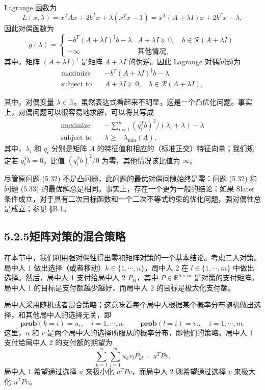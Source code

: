 \documentclass[UTF8,12pt,a4paper,fontset=fandol]{ctexart}
\begin{document}
Lagrange 函数为
\[
L(x,\lambda)=x^TAx+2b^Tx+\lambda(x^Tx-1)=x^T(A+\lambda I)x+2b^Tx-\lambda,
\]
因此对偶函数为
\[
g(\lambda)=
\begin{cases}
-b^T(A+\lambda I)^\dagger b-\lambda & A+\lambda I\succeq 0,\quad b\in\mathcal{R}(A+\lambda I)\\
-\infty & \text{其他情况},
\end{cases}
\]
其中，矩阵 $(A+\lambda I)^\dagger$ 是矩阵 $A+\lambda I$ 的伪逆。因此 Lagrange 对偶问题为
\begin{equation}
\begin{aligned}
\text{maximize}\quad & -b^T(A+\lambda I)^\dagger b-\lambda\\
\text{subject to}\quad & A+\lambda I\succeq 0,\quad b\in\mathcal{R}(A+\lambda I),
\end{aligned}
\tag{5.33}
\end{equation}

其中，对偶变量 $\lambda\in\mathbb{R}$。虽然表达式看起来不明显，这是一个凸优化问题。事实上，对偶问题可以很容易地求解，可以将其写成
\[
\begin{aligned}
\text{maximize}\quad & -\sum_{i=1}^n (q_i^Tb)^2/(\lambda_i+\lambda)-\lambda\\
\text{subject to}\quad & \lambda\geq -\lambda_{\min}(A),
\end{aligned}
\]
其中，$\lambda_i$ 和 $q_i$ 分别是矩阵 $A$ 的特征值和相应的（标准正交）特征向量；我们规定若 $q_i^Tb=0$，比值 $(q_i^Tb)^2/0$ 为零，其他情况该比值为 $\infty$。

尽管原问题 (5.32) 不是凸问题，此问题的最优对偶间隙始终是零：问题 (5.32) 和问题 (5.33) 的最优解总是相同。事实上，存在一个更为一般的结论：如果 Slater 条件成立，对于具有二次目标函数和一个二次不等式约束的优化问题，强对偶性总是成立；参见 §B.1。

\subsection*{5.2.5\quad 矩阵对策的混合策略}

在本节中，我们利用强对偶性得出零和矩阵对策的一个基本结论。考虑二人对策。局中人 1 做出选择（或者移动）$k\in\{1,\cdots,n\}$，局中人 2 在 $l\in\{1,\cdots,m\}$ 中做出选择。然后，局中人 1 支付给局中人 2 $P_{kl}$，其中 $P\in\mathbb{R}^{n\times m}$ 是对策的支付矩阵。局中人 1 的目标是支付额越少越好，而局中人 2 的目标是极大化支付额。

局中人采用随机或者混合策略；这意味着每个局中人根据某个概率分布随机做出选择，和其他局中人的选择无关，即
\[
\mathbf{prob}(k=i)=u_i,\quad i=1,\cdots,n,\qquad
\mathbf{prob}(l=i)=v_i,\quad i=1,\cdots,m.
\]
这里，$u$ 和 $v$ 是两个局中人的选择所服从的概率分布，即他们的策略。局中人 1 支付给局中人 2 的支付额的期望为
\[
\sum_{k=1}^n\sum_{l=1}^m u_kv_lP_{kl}=u^TPv.
\]
局中人 1 希望通过选择 $u$ 来极小化 $u^TPv$，而局中人 2 则希望通过选择 $v$ 来极大化 $u^TPv$。
\end{document}
